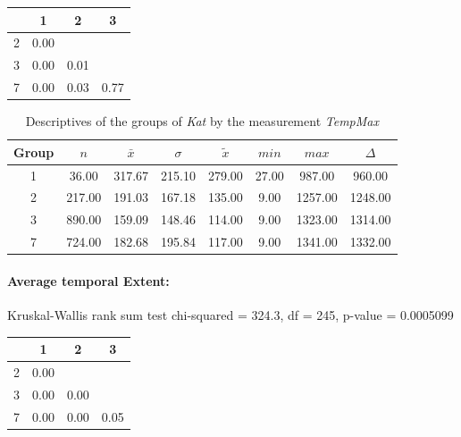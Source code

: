 \begin{table}[ht]
	\small
	\centering
	\begin{tabular}{c|c|c|c}
	  	\toprule
	 	& 1 & 2 & 3 \\ 
	  	\midrule
		2 & 0.00 &  &  \\ 
	  	3 & 0.00 & 0.01 &  \\ 
	  	7 & 0.00 & 0.03 & 0.77 \\ 
	   	\bottomrule
	\end{tabular}
\end{table}

\begin{table}[ht]
	\small
	\centering
	\begin{tabular}{c|c|c|c|c|c|c|c}
		\toprule
		Group & $n$ & $\bar{x}$ & $\sigma$ & $\tilde{x}$ & $min$ & $max$ & $\Delta$ \\   
	  	\midrule
		1 & 36.00 & 317.67 & 215.10 & 279.00   & 27.00 & 987.00 & 960.00  \\ 
	  	2 & 217.00 & 191.03 & 167.18 & 135.00 & 9.00 & 1257.00 & 1248.00  \\ 
	  	3 & 890.00 & 159.09 & 148.46 & 114.00 & 9.00 & 1323.00 & 1314.00  \\ 
	  	7 & 724.00 & 182.68 & 195.84 & 117.00  & 9.00 & 1341.00 & 1332.00 \\ 
	   	\bottomrule
	\end{tabular}
	\caption{Descriptives of the groups of \textit{Kat} by the measurement \textit{TempMax}}
\end{table}

\paragraph{Average temporal Extent:}
Kruskal-Wallis rank sum test chi-squared = 324.3, df = 245, p-value = 0.0005099

\begin{table}[ht]
	\small
	\centering
	\begin{tabular}{c|c|c|c}
	  	\toprule
	 	& 1 & 2 & 3 \\ 
	  	\midrule
		2 & 0.00 &  &  \\ 
	  	3 & 0.00 & 0.00 &  \\ 
	  	7 & 0.00 & 0.00 & 0.05 \\ 
	   	\bottomrule
	\end{tabular}
\end{table}

